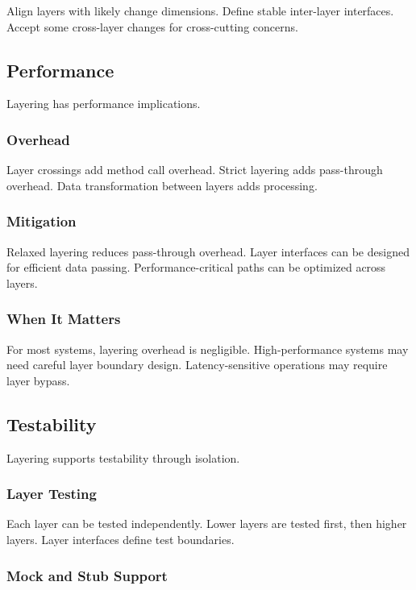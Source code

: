 \documentclass[11pt]{article}
\begin{document}
Align layers with likely change dimensions. Define stable inter-layer interfaces. Accept some cross-layer changes for cross-cutting concerns.

\subsection{Performance}

Layering has performance implications.

\subsubsection{Overhead}

Layer crossings add method call overhead. Strict layering adds pass-through overhead. Data transformation between layers adds processing.

\subsubsection{Mitigation}

Relaxed layering reduces pass-through overhead. Layer interfaces can be designed for efficient data passing. Performance-critical paths can be optimized across layers.

\subsubsection{When It Matters}

For most systems, layering overhead is negligible. High-performance systems may need careful layer boundary design. Latency-sensitive operations may require layer bypass.

\subsection{Testability}

Layering supports testability through isolation.

\subsubsection{Layer Testing}

Each layer can be tested independently. Lower layers are tested first, then higher layers. Layer interfaces define test boundaries.

\subsubsection{Mock and Stub Support}
\end{document}
